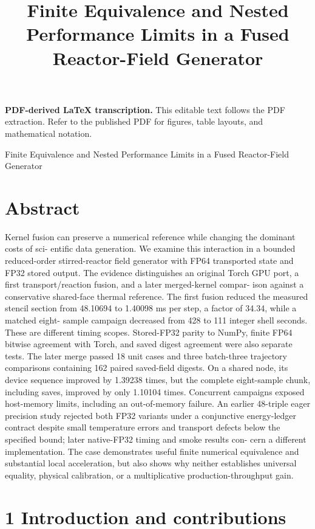 \documentclass[11pt]{article}
\title{Finite Equivalence and Nested Performance Limits in a Fused Reactor-Field Generator}
\author{}
\date{}
\begin{document}
\maketitle
\noindent\textbf{PDF-derived LaTeX transcription.} This editable text follows the PDF extraction. Refer to the published PDF for figures, table layouts, and mathematical notation.


Finite Equivalence and Nested Performance Limits in a Fused
Reactor-Field Generator

\section*{Abstract}

Kernel fusion can preserve a numerical reference while changing the dominant costs of sci-
entific data generation. We examine this interaction in a bounded reduced-order stirred-reactor
field generator with FP64 transported state and FP32 stored output. The evidence distinguishes
an original Torch GPU port, a first transport/reaction fusion, and a later merged-kernel compar-
ison against a conservative shared-face thermal reference. The first fusion reduced the measured
stencil section from 48.10694 to 1.40098 ms per step, a factor of 34.34, while a matched eight-
sample campaign decreased from 428 to 111 integer shell seconds. These are different timing
scopes. Stored-FP32 parity to NumPy, finite FP64 bitwise agreement with Torch, and saved
digest agreement were also separate tests. The later merge passed 18 unit cases and three
batch-three trajectory comparisons containing 162 paired saved-field digests. On a shared node,
its device sequence improved by 1.39238 times, but the complete eight-sample chunk, including
saves, improved by only 1.10104 times. Concurrent campaigns exposed host-memory limits,
including an out-of-memory failure. An earlier 48-triple eager precision study rejected both
FP32 variants under a conjunctive energy-ledger contract despite small temperature errors and
transport defects below the specified bound; later native-FP32 timing and smoke results con-
cern a different implementation. The case demonstrates useful finite numerical equivalence and
substantial local acceleration, but also shows why neither establishes universal equality, physical
calibration, or a multiplicative production-throughput gain.

\section*{1 Introduction and contributions}
\end{document}
